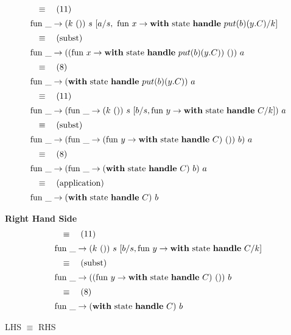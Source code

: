 \documentclass[logo,bsc,singlespacing,parskip]{infthesis}
\begin{document}
\[ 
\begin{array}{l}
\quad\equiv\quad (11) \\[5pt]
\text{fun }\_ \rightarrow (k\ ())\ s\ [a/s,\ \text{fun } x \rightarrow \text{\textbf{with} state \textbf{handle} } put(b)(y.C)/k] \\[5pt]
\quad\equiv\quad (\text{subst}) \\[5pt]
\text{fun }\_ \rightarrow ((\text{fun } x \rightarrow \text{\textbf{with} state \textbf{handle} } put(b)(y.C))\ ())\ a \\[5pt]
\quad\equiv\quad (8) \\[5pt]
\text{fun }\_ \rightarrow (\text{\textbf{with} state \textbf{handle} } put(b)(y.C))\ a \\[5pt]
\quad\equiv\quad (11) \\[5pt]
\text{fun }\_ \rightarrow (\text{fun }\_ \rightarrow (k\ ())\ s\ [b/s, \text{fun } y \rightarrow \text{\textbf{with} state \textbf{handle} } C/k])\ a \\[5pt]
\quad\equiv\quad (\text{subst}) \\[5pt]
\text{fun }\_ \rightarrow (\text{fun }\_ \rightarrow (\text{fun } y \rightarrow \text{\textbf{with} state \textbf{handle} } C)\ ())\ b)\ a \\[5pt]
\quad\equiv\quad (8) \\[5pt]
\text{fun }\_ \rightarrow (\text{fun }\_ \rightarrow (\text{\textbf{with} state \textbf{handle} } C)\ b)\ a \\[5pt]
\quad\equiv\quad (\text{application}) \\[5pt]
\text{fun }\_ \rightarrow (\text{\textbf{with} state \textbf{handle} } C)\ b
\end{array}
\]

\textbf{Right Hand Side}
\[ 
\begin{array}{l}
\quad\equiv\quad (11) \\[5pt]
\text{fun }\_ \rightarrow (k\ ())\ s\ [b/s, \text{fun } y \rightarrow \text{\textbf{with} state \textbf{handle} } C/k] \\[5pt]
\quad\equiv\quad (\text{subst}) \\[5pt]
\text{fun }\_ \rightarrow ((\text{fun } y \rightarrow \text{\textbf{with} state \textbf{handle} } C)\ ())\ b \\[5pt]
\quad\equiv\quad (8) \\[5pt]
\text{fun }\_ \rightarrow (\text{\textbf{with} state \textbf{handle} } C)\ b
\end{array}
\]

LHS $\equiv$ RHS
\end{document}
